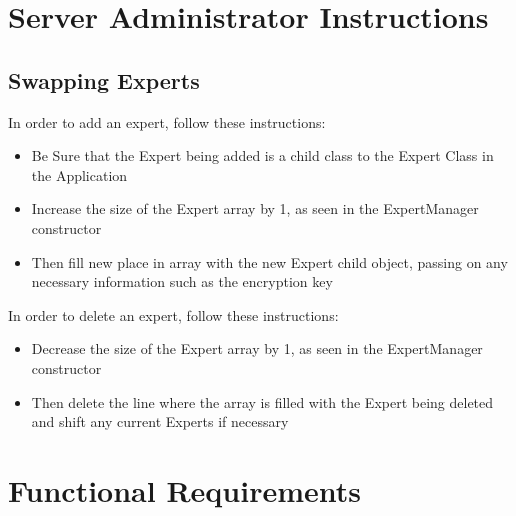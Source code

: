 \documentclass{article}
\begin{document}
\section{Server Administrator Instructions}

\subsection{Swapping Experts}
In order to add an expert, follow these instructions:
\begin{itemize} 
	\item Be Sure that the Expert being added is a child class to the Expert Class in the Application
	\item Increase the size of the Expert array by 1, as seen in the ExpertManager constructor
	\item Then fill new place in array with the new Expert child object, passing on any necessary information such as the encryption key
\end{itemize}
In order to delete an expert, follow these instructions:
\begin{itemize} 
	\item Decrease the size of the Expert array by 1, as seen in the ExpertManager constructor
	\item Then delete the line where the array is filled with the Expert being deleted and shift any current Experts if necessary 
\end{itemize}

\section{Functional Requirements}

\newpage
\listoffigures
\end{document}
